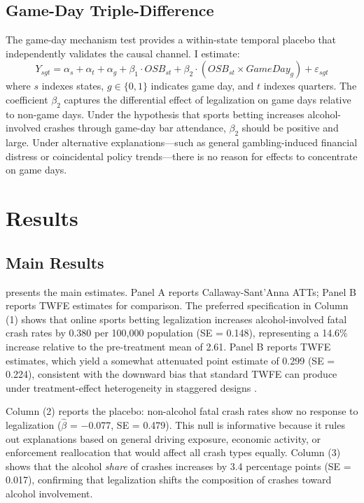 \documentclass[12pt]{article}
\begin{document}
\subsection{Game-Day Triple-Difference}

The game-day mechanism test provides a within-state temporal placebo that independently validates the causal channel. I estimate:
\begin{equation}
Y_{sgt} = \alpha_s + \alpha_t + \alpha_g + \beta_1 \cdot OSB_{st} + \beta_2 \cdot (OSB_{st} \times GameDay_{g}) + \varepsilon_{sgt}
\end{equation}
where $s$ indexes states, $g \in \{0,1\}$ indicates game day, and $t$ indexes quarters. The coefficient $\beta_2$ captures the differential effect of legalization on game days relative to non-game days. Under the hypothesis that sports betting increases alcohol-involved crashes through game-day bar attendance, $\beta_2$ should be positive and large. Under alternative explanations---such as general gambling-induced financial distress or coincidental policy trends---there is no reason for effects to concentrate on game days.

\section{Results}

\subsection{Main Results}



 presents the main estimates. Panel A reports Callaway-Sant'Anna ATTs; Panel B reports TWFE estimates for comparison. The preferred specification in Column (1) shows that online sports betting legalization increases alcohol-involved fatal crash rates by 0.380 per 100,000 population (SE = 0.148), representing a 14.6\% increase relative to the pre-treatment mean of 2.61. Panel B reports TWFE estimates, which yield a somewhat attenuated point estimate of 0.299 (SE = 0.224), consistent with the downward bias that standard TWFE can produce under treatment-effect heterogeneity in staggered designs \citep{SunAbraham2021}.

Column (2) reports the placebo: non-alcohol fatal crash rates show no response to legalization ($\hat{\beta}$ = $-$0.077, SE = 0.479). This null is informative because it rules out explanations based on general driving exposure, economic activity, or enforcement reallocation that would affect all crash types equally. Column (3) shows that the alcohol \textit{share} of crashes increases by 3.4 percentage points (SE = 0.017), confirming that legalization shifts the composition of crashes toward alcohol involvement.
\end{document}
